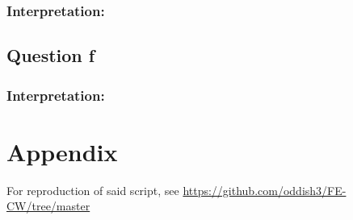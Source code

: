 \documentclass{article}
\begin{document}
\subsubsection*{Interpretation:}

\subsection*{Question f}
\subsubsection*{Interpretation:}

\section*{Appendix}

For reproduction of said script, see \url{https://github.com/oddish3/FE-CW/tree/master}


\end{document}
